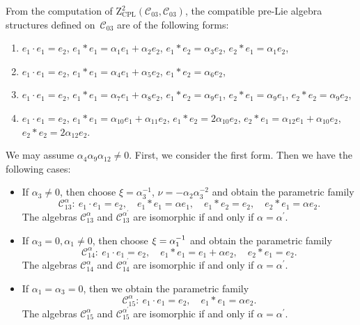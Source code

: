 \documentclass[pdftex]{sigma}
\numberwithin{equation}{section}
\begin{document}
From the computation of $\mathrm{Z}_{\mathrm{CPL}}^{2}(\mathcal{C}_{03},%
\mathcal{C}_{03})$, the compatible pre-Lie algebra structures defined on~$%
\mathcal{C}_{03}$ are of the following forms:
\begin{enumerate}\itemsep=0pt
\item[(1)] $
e_{1}\cdot e_{1}=e_{2}$, $
e_{1}\ast e_{1}=\alpha _{1}e_{1}+\alpha _{2}e_{2}$, $ e_{1}\ast
e_{2}=\alpha _{3}e_{2}$, $ e_{2}\ast e_{1}=\alpha _{1}e_{2}$,
\item[(2)] $
e_{1}\cdot e_{1}=e_{2}$, $
e_{1}\ast e_{1}=\alpha _{4}e_{1}+\alpha _{5}e_{2}$, $ e_{1}\ast
e_{2}=\alpha _{6}e_{2}$,
\item[(3)] $
e_{1}\cdot e_{1}=e_{2}$, $
e_{1}\ast e_{1}=\alpha _{7}e_{1}+\alpha _{8}e_{2}$, $ e_{1}\ast
e_{2}=\alpha _{9}e_{1}$, $ e_{2}\ast e_{1}=\alpha _{9}e_{1}$, $ e_{2}\ast
e_{2}=\alpha _{9}e_{2}$,
\item[(4)] $
e_{1}\cdot e_{1}=e_{2}$, $
e_{1}\ast e_{1}=\alpha _{10}e_{1}+\alpha _{11}e_{2}$, $ e_{1}\ast
e_{2}=2\alpha _{10}e_{2}$,
$
e_{2}\ast e_{1}=\alpha _{12}e_{1}+\alpha
_{10}e_{2}$, $ e_{2}\ast e_{2}=2\alpha _{12}e_{2}$.
\end{enumerate}

We may assume $\alpha _{4}\alpha _{9}\alpha _{12}\neq 0$.
First, we consider the first form. Then we have the following cases:
\begin{itemize}\itemsep=0pt
\item If $\alpha _{3}\neq 0$, then choose $\xi =\alpha^{-1} _{3}$, $\nu =-%
{\alpha _{2}}{\alpha _{3}^{-2}}$ and obtain the parametric family
\[
\mathcal{C}_{13}^{\alpha } \colon \
e_{1}\cdot e_{1}=e_{2},\quad
e_{1}\ast e_{1}=\alpha e_{1},\quad e_{1}\ast e_{2}=e_{2},\quad e_{2}\ast
e_{1}=\alpha e_{2}.
\]
The algebras $\mathcal{C}_{13}^{\alpha }$ and $\mathcal{C}_{13}^{\alpha ^{\prime
}} $ are isomorphic if and only if $\alpha =\alpha ^{\prime }$.

\item If $\alpha _{3}=0,\alpha _{1}\neq 0$, then choose $\xi ={%
\alpha^{-1} _{1}}$ and obtain the parametric family
\[
\mathcal{C}_{14}^{\alpha } \colon \
e_{1}\cdot e_{1}=e_{2},\quad
e_{1}\ast e_{1}=e_{1}+\alpha e_{2},\quad e_{2}\ast e_{1}=e_{2}.
\]
The algebras $\mathcal{C}_{14}^{\alpha }$ and $\mathcal{C}_{14}^{\alpha ^{\prime
}} $ are isomorphic if and only if $\alpha =\alpha ^{\prime }$.

\item If $\alpha _{1}=\alpha _{3}=0$, then we obtain the parametric family
\[
\mathcal{C}_{15}^{\alpha } \colon \
e_{1}\cdot e_{1}=e_{2}, \quad
e_{1}\ast e_{1}=\alpha e_{2}.
\]
The algebras $\mathcal{C}_{15}^{\alpha }$ and $\mathcal{C}_{15}^{\alpha ^{\prime
}} $ are isomorphic if and only if $\alpha =\alpha ^{\prime }$.
\end{itemize}
\end{document}
